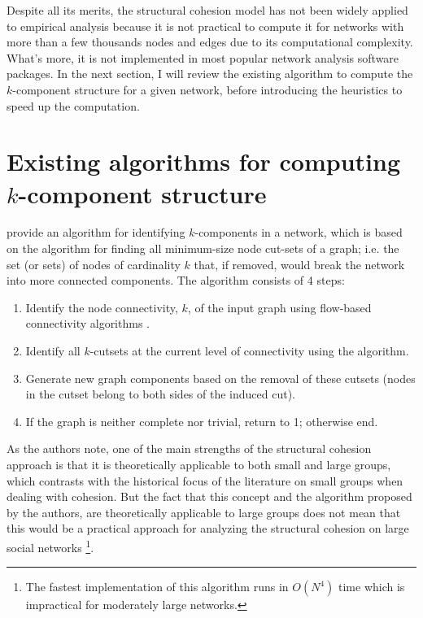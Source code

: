 Despite all its merits, the structural cohesion model has not been widely applied to empirical analysis because it is not practical to compute it for networks with more than a few thousands nodes and edges due to its computational complexity. What's more, it is not implemented in most popular network analysis software packages. In the next section, I will review the existing algorithm to compute the $k$-component structure for a given network, before introducing the heuristics to speed up the computation.

\section{Existing algorithms for computing $k$-component structure}

\citet[appendix A]{moody:2003} provide an algorithm for identifying $k$-components in a network, which is based on the \citet{kanevsky:1993} algorithm for finding all minimum-size node cut-sets of a graph; i.e. the set (or sets) of nodes of cardinality $k$ that, if removed, would break the network into more connected components. The algorithm consists of 4 steps:

\begin{enumerate}

\item Identify the node connectivity, $k$, of the input graph using flow-based connectivity algorithms \citep[chapter 7]{brandes:2005}.

\item Identify all $k$-cutsets at the current level of connectivity using the \citet{kanevsky:1993} algorithm.

\item Generate new graph components based on the removal of these cutsets (nodes in the cutset belong to both sides of the induced cut).

\item If the graph is neither complete nor trivial, return to 1; otherwise end.

\end{enumerate}

As the authors note, one of the main strengths of the structural cohesion approach is that it is theoretically applicable to both small and large groups, which contrasts with the historical focus of the literature on small groups when dealing with cohesion. But the fact that this concept and the algorithm proposed by the authors, are theoretically applicable to large groups does not mean that this would be a practical approach for analyzing the structural cohesion on large social networks \footnote{The fastest implementation of this algorithm runs in $O(N^4)$ time \citep{igraph} which is impractical for moderately large networks.}.

